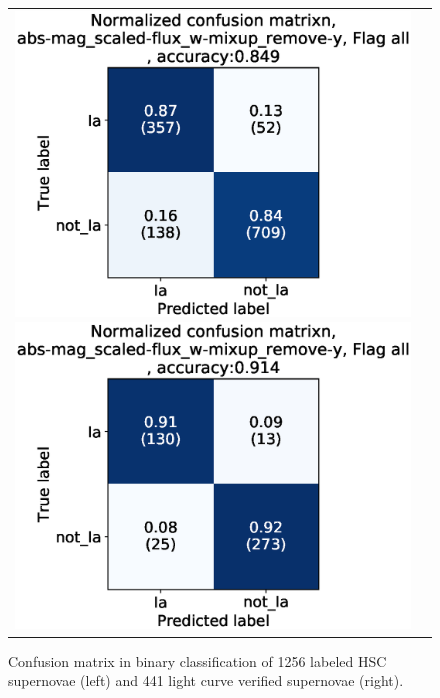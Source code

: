 \documentclass[useamsfonts]{pasj01}
\begin{document}
\begin{figure}[ht]
    \begin{tabular}{cc}
        \begin{minipage}{0.5\hsize}
            \begin{center}
                \includegraphics[width=\columnwidth]{figures/10_CM_abs-mag_scaled-flux_w-mixup_remove-y_predictions_test_2_Flagall_all.eps}
            \end{center}
        \end{minipage}
        \begin{minipage}{0.5\hsize}
            \begin{center}
                \includegraphics[width=\columnwidth]{figures/10_CM_abs-mag_scaled-flux_w-mixup_remove-y_predictions_test_2_Flagall_noedge_spec.eps}
            \end{center}
        \end{minipage}
    \end{tabular}
    \caption{%
  Confusion matrix in binary classification of 1256 labeled HSC supernovae (left) and 441 light curve verified supernovae (right).
}%
    \label{fig:h2_test_CM}
\end{figure}
%
%
\end{document}
